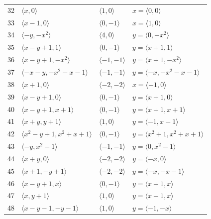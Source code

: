 \documentclass[11pt]{article}
\begin{document}
\begin{longtable}{@{}rlll@{}}
32 & $\langle x,0\rangle$ & $\langle 1,0\rangle$ & $x=\langle 0,0\rangle$\\
33 & $\langle x-1,0\rangle$ & $\langle 0,-1\rangle$ & $x=\langle 1,0\rangle$\\
34 & $\langle -y,-x^{2}\rangle$ & $\langle 4,0\rangle$ & $y=\langle 0,-x^{2}\rangle$\\
35 & $\langle x-y+1,1\rangle$ & $\langle 0,-1\rangle$ & $y=\langle x+1,1\rangle$\\
36 & $\langle x-y+1,-x^{2}\rangle$ & $\langle -1,-1\rangle$ & $y=\langle x+1,-x^{2}\rangle$\\
37 & $\langle -x-y,-x^{2}-x-1\rangle$ & $\langle -1,-1\rangle$ & $y=\langle -x,-x^{2}-x-1\rangle$\\
38 & $\langle x+1,0\rangle$ & $\langle -2,-2\rangle$ & $x=\langle -1,0\rangle$\\
39 & $\langle x-y+1,0\rangle$ & $\langle 0,-1\rangle$ & $y=\langle x+1,0\rangle$\\
40 & $\langle x-y+1,x+1\rangle$ & $\langle 0,-1\rangle$ & $y=\langle x+1,x+1\rangle$\\
41 & $\langle x+y,y+1\rangle$ & $\langle 1,0\rangle$ & $y=\langle -1,x-1\rangle$\\
42 & $\langle x^{2}-y+1,x^{2}+x+1\rangle$ & $\langle 0,-1\rangle$ & $y=\langle x^{2}+1,x^{2}+x+1\rangle$\\
43 & $\langle -y,x^{2}-1\rangle$ & $\langle -1,-1\rangle$ & $y=\langle 0,x^{2}-1\rangle$\\
44 & $\langle x+y,0\rangle$ & $\langle -2,-2\rangle$ & $y=\langle -x,0\rangle$\\
45 & $\langle x+1,-y+1\rangle$ & $\langle -2,-2\rangle$ & $y=\langle -x,-x-1\rangle$\\
46 & $\langle x-y+1,x\rangle$ & $\langle 0,-1\rangle$ & $y=\langle x+1,x\rangle$\\
47 & $\langle x,y+1\rangle$ & $\langle 1,0\rangle$ & $y=\langle x-1,x\rangle$\\
48 & $\langle x-y-1,-y-1\rangle$ & $\langle 1,0\rangle$ & $y=\langle -1,-x\rangle$\\
\end{longtable}
\endgroup
\end{document}
